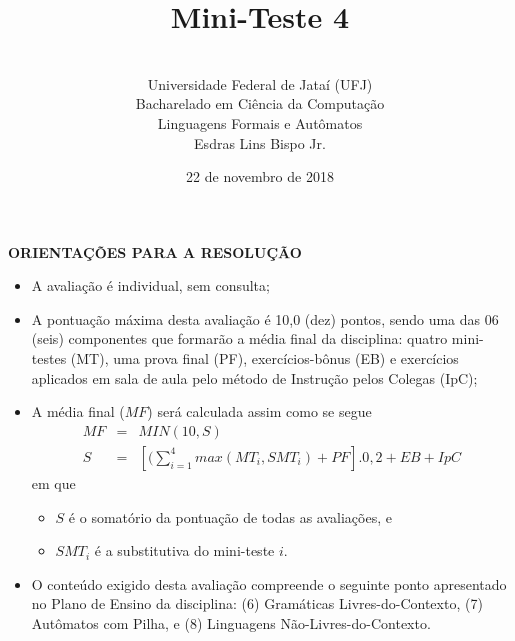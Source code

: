 \documentclass[12pt,a4paper,oneside]{article}
\author{\\Universidade Federal de Jataí (UFJ)\\Bacharelado em Ciência da Computação \\Linguagens Formais e Autômatos \\Esdras Lins Bispo Jr.}
\date{22 de novembro de 2018}
\title{\sc \huge Mini-Teste 4}
\begin{document}
\maketitle

{\bf ORIENTAÇÕES PARA A RESOLUÇÃO}

\small
 
\begin{itemize}
	\item A avaliação é individual, sem consulta;
	\item A pontuação máxima desta avaliação é 10,0 (dez) pontos, sendo uma das 06 (seis) componentes que formarão a média final da disciplina: quatro mini-testes (MT), uma prova final (PF), exercícios-bônus (EB) e exercícios aplicados em sala de aula pelo método de Instrução pelos Colegas (IpC);
	\item A média final ($MF$) será calculada assim como se segue
	\begin{eqnarray}
		MF & = & MIN(10, S) \nonumber \\
		S & = & [(\sum_{i=1}^{4} max(MT_i, SMT_i ) + PF].0,2  + EB + IpC\nonumber
	\end{eqnarray}
	em que 
	\begin{itemize}
		\item $S$ é o somatório da pontuação de todas as avaliações, e
		\item $SMT_i$ é a substitutiva do mini-teste $i$.
	\end{itemize}
	\item O conteúdo exigido desta avaliação compreende o seguinte ponto apresentado no Plano de Ensino da disciplina: (6) Gramáticas Livres-do-Contexto, (7) Autômatos com Pilha, e (8) Linguagens Não-Livres-do-Contexto.
\end{itemize}

\begin{center}
\end{center}

\newpage
\end{document}
